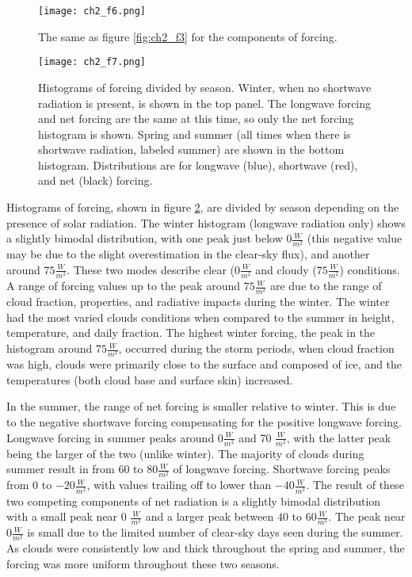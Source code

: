 \begin{figure}[H]
    \centering
    \texttt{[image: ch2\_f6.png]}
    \caption[Shortwave, longwave, and net components of forcing.]{The same as figure \ref{fig:ch2_f3} for the components of forcing.}
    \label{fig:ch2_f6}
\end{figure}


\begin{figure}[H]
    \centering
    \texttt{[image: ch2\_f7.png]}
    \caption[Histograms of cloud radiative forcing by season]{Histograms of forcing divided by season. Winter, when no shortwave radiation is present, is shown in the top panel. The longwave forcing and net forcing are the same at this time, so only the net forcing histogram is shown. Spring and summer (all times when there is shortwave radiation, labeled summer) are shown in the bottom histogram. Distributions are for longwave (blue), shortwave (red), and net (black) forcing.}
    \label{fig:ch2_f7}
\end{figure}

Histograms of forcing, shown in figure \ref{fig:ch2_f7}, are divided by season depending on the presence of solar radiation. The winter histogram (longwave radiation only) shows a slightly bimodal distribution, with one peak just below $0 \frac{W}{m^{2}}$ (this negative value may be due to the slight overestimation in the clear-sky flux), and another around $75 \frac{W}{m^{2}}$. These two modes describe clear ($0 \frac{W}{m^{2}}$ and cloudy ($75 \frac{W}{m^{2}}$) conditions. A range of forcing values up to the peak around $75 \frac{W}{m^{2}}$ are due to the range of cloud fraction, properties, and radiative impacts during the winter. The winter had the most varied clouds conditions when compared to the summer in height, temperature, and daily fraction. The highest winter forcing, the peak in the histogram around $75 \frac{W}{m^{2}}$, occurred during the storm periods, when cloud fraction was high, clouds were primarily close to the surface and composed of ice, and the temperatures (both cloud base and surface skin) increased.  

In the summer, the range of net forcing is smaller relative to winter. This is due to the negative shortwave forcing compensating for the positive longwave forcing. Longwave forcing in summer peaks around $0 \frac{W}{m^{2}}$ and 70 $\frac{W}{m^{2}}$, with the latter peak being the larger of the two (unlike winter). The majority of clouds during summer result in from $60$ to $80 \frac{W}{m^{2}}$ of longwave forcing. Shortwave forcing peaks from $0$ to $-20 \frac{W}{m^{2}}$, with values trailing off to lower than $-40 \frac{W}{m^{2}}$. The result of these two competing components of net radiation is a slightly bimodal distribution with a small peak near 0 $\frac{W}{m^{2}}$ and a larger peak between $40$ to $60 \frac{W}{m^{2}}$. The peak near $0 \frac{W}{m^{2}}$ is small due to the limited number of clear-sky days seen during the summer. As clouds were consistently low and thick throughout the spring and summer, the forcing was more uniform throughout these two seasons.

